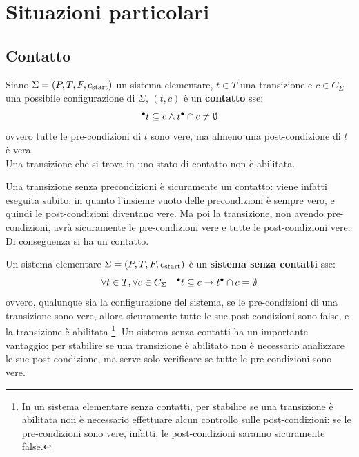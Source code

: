 \section{Situazioni particolari}
\subsection*{Contatto}
\begin{defn}
    Siano $\Sigma = (P, T, F, c_{\textnormal{start}})$ un sistema elementare, $t \in T$
    una transizione e $c \in C_{\Sigma}$ una possibile configurazione di $\Sigma$,
    $(t, c)$ è un \textbf{contatto} sse:
    \[
        {^\bullet}t \subseteq c \land t^\bullet \cap c \neq \emptyset
    \]
    ovvero tutte le pre-condizioni di $t$ sono vere, ma almeno una
    post-condizione di $t$ è vera.\\
    Una transizione che si trova in uno stato di contatto non è abilitata.
\end{defn}

\begin{rem}
    Una transizione senza precondizioni è sicuramente un contatto: viene
    infatti eseguita subito, in quanto l'insieme vuoto delle precondizioni
    è sempre vero, e quindi le post-condizioni diventano vere.
    Ma poi la transizione, non
    avendo pre-condizioni, avrà sicuramente le pre-condizioni vere e tutte
    le post-condizioni vere. Di conseguenza si ha un contatto.
\end{rem}

\begin{defn}
    Un sistema elementare $\Sigma = (P, T, F, c_{\textnormal{start}})$ è un
    \textbf{sistema senza contatti} sse:
    \[
        \forall t \in T, \forall c \in C_{\Sigma} \quad
        {^\bullet}t \subseteq c \rightarrow t^\bullet \cap c = \emptyset
    \]
    ovvero, qualunque sia la configurazione del sistema, se le pre-condizioni
    di una transizione sono vere, allora sicuramente tutte le sue post-condizioni
    sono false, e la transizione è abilitata \footnote{In un sistema elementare
    senza contatti, per stabilire se una transizione è abilitata non è necessario
    effettuare alcun controllo sulle post-condizioni: se le pre-condizioni
    sono vere, infatti, le post-condizioni saranno sicuramente false.}.
    Un sistema senza contatti ha un importante vantaggio: per stabilire
    se una transizione è abilitato non è necessario analizzare le sue
    post-condizione, ma serve solo verificare se tutte le pre-condizioni
    sono vere.
\end{defn}

